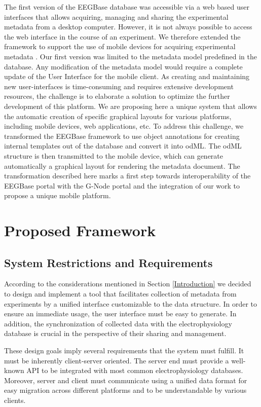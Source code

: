 \documentclass[a4paper,twoside]{article}
\begin{document}
The first version of the EEGBase database was accessible via a web based user interfaces that allows acquiring, managing and sharing the experimental metadata from a desktop computer. However, it is not always possible to access the web interface in the course of an experiment. We therefore extended the framework to support the use of mobile devices for acquiring experimental metadata \cite{10.3389/fninf.2014.00020}. Our first version was limited to the metadata model predefined in the database. Any modification of the metadata model would require a complete update of the User Interface for the mobile client.
As creating and maintaining new user-interfaces is time-consuming and requires extensive development resources, the challenge is to elaborate a solution to optimize the further development of this platform. We are proposing here a unique system that allows the automatic creation of specific graphical layouts for various platforms, including mobile devices, web applications, etc. To address this challenge, we transformed the EEGBase framework to use object annotations \cite{6645264} for creating internal templates out of the database and convert it into odML. The odML structure is then transmitted to the mobile device, which can generate automatically a graphical layout for rendering the metadata document.
The transformation described here marks a first step towards interoperability of the EEGBase portal with the G-Node portal and the integration of our work to propose a unique mobile platform.

\section{Proposed Framework}\label{Framework}

\subsection{System Restrictions and Requirements}

According to the considerations mentioned in Section \ref{Introduction} we decided to design and implement a tool that facilitates collection of metadata from experiments by a unified interface customizable to the data structure. In order to ensure an immediate usage, the user interface must be easy to generate. In addition, the synchronization of collected data with the electrophysiology database is crucial in the perspective of their sharing and management.

These design goals imply several requirements that the system must fulfill. It must be inherently client-server oriented. The server end must provide a well-known API to be integrated with most common electrophysiology databases. Moreover, server and client must communicate using a unified data format for easy migration across different platforms and to be understandable by various clients.
\end{document}
